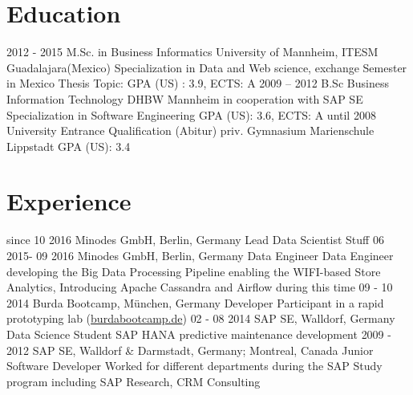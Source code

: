 \documentclass[a4paper]{friggeri-cv}
\begin{document}
\section{Education}

\begin{entrylist}
  \eduentrythesis
    {2012 - 2015}
    {M.Sc. in Business Informatics}
    {University of Mannheim, ITESM Guadalajara(Mexico)}
    {Specialization in Data and Web science, exchange Semester in Mexico}
    {Thesis Topic:}
    {GPA (US) : 3.9, ECTS: A}
  \eduentry
    {2009 – 2012}
    {B.Sc Business Information Technology}
    {DHBW Mannheim in cooperation with SAP SE}
    {Specialization in Software Engineering}
    {GPA (US): 3.6, ECTS: A}
  \entry
    {until 2008}
    {University Entrance Qualification (Abitur)}
    {priv. Gymnasium Marienschule Lippstadt}
    {GPA (US): 3.4}
\end{entrylist}

\section{Experience}

\begin{entrylist}
  \entry
    {since 10 2016 }
    {Minodes GmbH, Berlin, Germany}
    {Lead Data Scientist}
    {Stuff}
   \entry
    {06 2015- 09 2016 }
    {Minodes GmbH, Berlin, Germany}
    {Data Engineer}
    {Data Engineer developing the Big Data Processing Pipeline enabling the WIFI-based Store Analytics, Introducing Apache Cassandra and Airflow during this time}
  \entry
    {09 - 10 2014}
    {Burda Bootcamp, München, Germany}
    {Developer}
    {Participant in a rapid prototyping lab (\href{http://burdabootcamp.de}{burdabootcamp.de})}
  \entry
    {02 - 08 2014}
    {SAP SE, Walldorf, Germany}
    {Data Science Student}
    {SAP HANA predictive maintenance development}
  \entry
    {2009 - 2012}
    {SAP SE, Walldorf \&  Darmstadt, Germany; Montreal, Canada}
    {Junior Software Developer}
    { Worked for different departments during the SAP Study program including SAP Research, CRM Consulting}
\end{entrylist}
\end{document}
